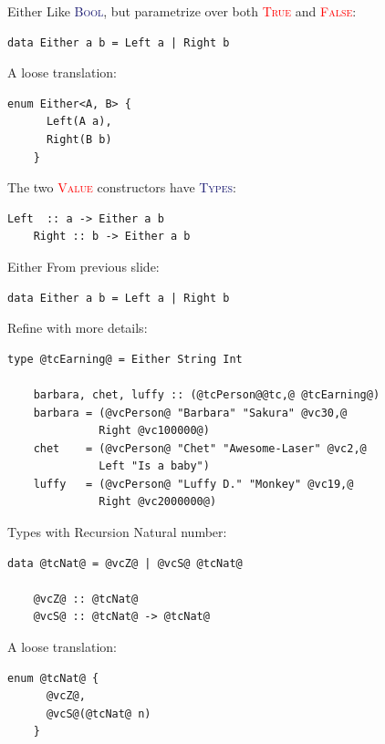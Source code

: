 \documentclass[xcolor={usenames,dvipsnames}]{beamer}
\newcommand{\htycon}[1]{\textcolor{MidnightBlue}{\textsc{#1}}}
\newcommand{\hvalcon}[1]{\textcolor{Red}{\textsc{#1}}}
\begin{document}
\begin{frame}[fragile]{Either}
  Like \htycon{Bool}, but parametrize over both \hvalcon{True} and \hvalcon{False}:
  \begin{lstlisting}[style=hask]
    data Either a b = Left a | Right b
  \end{lstlisting}

  \pause
  A loose translation:
  \begin{lstlisting}[style=hask]
    enum Either<A, B> {
      Left(A a),
      Right(B b)
    }
  \end{lstlisting}

  \pause
  The two \hvalcon{Value} constructors have \htycon{Types}:
  \begin{lstlisting}[style=hask]
    Left  :: a -> Either a b
    Right :: b -> Either a b
  \end{lstlisting}
\end{frame}

\begin{frame}[fragile]{Either}
  From previous slide:
  \begin{lstlisting}[style=hask]
    data Either a b = Left a | Right b
  \end{lstlisting}

  \pause
  Refine with more details:
  \begin{lstlisting}[style=hask]
    type @tcEarning@ = Either String Int

    barbara, chet, luffy :: (@tcPerson@@tc,@ @tcEarning@)
    barbara = (@vcPerson@ "Barbara" "Sakura" @vc30,@
              Right @vc100000@)
    chet    = (@vcPerson@ "Chet" "Awesome-Laser" @vc2,@
              Left "Is a baby") 
    luffy   = (@vcPerson@ "Luffy D." "Monkey" @vc19,@
              Right @vc2000000@)
  \end{lstlisting}
\end{frame}

\begin{frame}[fragile]{Types with Recursion}
  Natural number:
  \begin{lstlisting}[style=hask]
    data @tcNat@ = @vcZ@ | @vcS@ @tcNat@

    @vcZ@ :: @tcNat@
    @vcS@ :: @tcNat@ -> @tcNat@
  \end{lstlisting}

  \pause
  A loose translation:
  \begin{lstlisting}[style=hask]
    enum @tcNat@ {
      @vcZ@,
      @vcS@(@tcNat@ n)
    }
  \end{lstlisting}
\end{frame}
\end{document}
